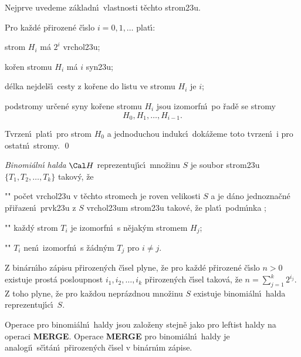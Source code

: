 \midinsert
\centerline{}
\endcaption
\endinsert

\flushpar Nejprve uvedeme z\'akladn\'\i\ vlastnosti t\v echto 
strom\accent23u.

Pro ka\v zd\'e p\v rirozen\'e \v c\'\i slo $
i=0,1,\dots$ 
plat\'\i :
\roster
\item
strom $H_i$ m\'a $2^i$ vrchol\accent23u;
\item
ko\v ren stromu $H_i$ m\'a $i$ syn\accent23u;
\item
d\'elka nejdel\v s\'\i\ cesty z ko\v rene do listu ve stromu $H_i$ je 
$i$;
\item
podstromy ur\v cen\'e syny ko\v rene stromu $H_i$ jsou izomorf\-n\'\i\ 
po \v rad\v e se stromy $$H_0,H_1,\dots,H_{i-1}.$$
\endroster
\endproclaim

Tvrzen\'\i\ plat\'\i\ pro strom $H_0$ a 
jednoduchou indukc\'\i\ dok\'a\v zeme toto tvrzen\'\i\  i pro ostatn\'\i\ stromy. \qed
\enddemo


\flushpar\emph{Binomi\'aln\'\i} \emph{halda} $\Cal H$ reprezentuj\'\i c\'\i\ 
mno\v zinu $S$ je soubor strom\accent23u $\{T_1,T_2,\dots,T_k\}$ 
takov\'y, \v ze 
\roster
\item"{}"
po\v cet vrchol\accent23u v t\v echto stromech je roven 
velikosti $S$ a 
je d\'ano jednozna\v cn\'e p\v ri\v razen\'\i\ prvk\accent23u 
z $S$ vrchol\accent23um strom\accent23u tako\-v\'e, \v ze plat\'\i\ 
podm\'\i nka ;
\item"{}"
ka\v zd\'y strom $T_i$ je izomorfn\'\i\ s n\v ejak\'ym stromem $H_
j$;
\item"{}"
$T_i$ nen\'\i\ izomorfn\'\i\ s \v z\'adn\'ym $T_j$ pro $i\ne j$.
\endroster
\medskip

\flushpar Z bin\'arn\'\i ho z\'apisu p\v rirozen\'ych \v c\'\i sel plyne, \v ze 
pro ka\v zd\'e p\v riro\-ze\-n\'e \v c\'\i slo $n>0$ existuje prost\'a 
posloupnost $i_1,i_2,\dots,i_k$ p\v riro\-ze\-n\'ych \v c\'\i sel takov\'a, \v ze 
$n=\sum_{j=1}^k2^{i_j}$. Z toho plyne, \v ze pro ka\v zdou nepr\'azd\-nou 
mno\v zinu $S$ existuje binomi\'aln\'\i\ halda repre\-zentuj\'\i c\'\i\ $
S$.
\medskip

\flushpar Operace pro binomi\'aln\'\i\ haldy jsou zalo\v zeny 
stejn\v e jako pro leftist haldy na operaci {\bf MER\-GE}. Operace 
{\bf MERGE} pro binomi\'aln\'\i\ haldy je analogi\'\i\ s\v c\'\i t\'an\'\i\ 
p\v rirozen\'ych \v c\'\i sel v bin\'ar\-n\'\i m z\'apise.
\bigskip


